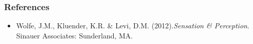 \documentclass[]{beamer}
\begin{document}
\begin{frame}
 \frametitle{References}
\begin{small}
\begin{itemize}
 \item  Wolfe, J.M., Kluender, K.R. \& Levi, D.M. (2012).\textit{Sensation \& Perception}. Sinauer Associates: Sunderland, MA. 
\end{itemize}
\end{small}
\end{frame}
\end{document}
